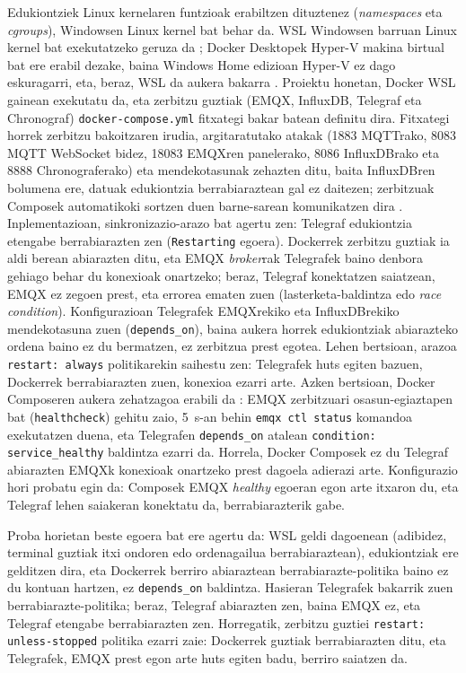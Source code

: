 \documentclass[10pt]{article}
\begin{document}
Edukiontziek Linux kernelaren funtzioak erabiltzen dituztenez (\textit{namespaces} eta \textit{cgroups}), Windowsen Linux kernel bat behar da. \ac{WSL} Windowsen barruan Linux kernel bat exekutatzeko geruza da \cite{microsoft_wsl}; Docker Desktopek Hyper-V makina birtual bat ere erabil dezake, baina Windows Home edizioan Hyper-V ez dago eskuragarri, eta, beraz, \ac{WSL} da aukera bakarra \cite{docker_windows}. Proiektu honetan, Docker \ac{WSL} gainean exekutatu da, eta zerbitzu guztiak (EMQX, InfluxDB, Telegraf eta Chronograf) \texttt{docker-compose.yml} fitxategi bakar batean definitu dira. Fitxategi horrek zerbitzu bakoitzaren irudia, argitaratutako atakak (1883 \ac{MQTT}rako, 8083 \ac{MQTT} WebSocket bidez, 18083 EMQXren panelerako, 8086 InfluxDBrako eta 8888 Chronograferako) eta mendekotasunak zehazten ditu, baita InfluxDBren bolumena ere, datuak edukiontzia berrabiaraztean gal ez daitezen; zerbitzuak Composek automatikoki sortzen duen barne-sarean komunikatzen dira \cite{docker_networking}.\\

Inplementazioan, sinkronizazio-arazo bat agertu zen: Telegraf edukiontzia etengabe berrabiarazten zen (\texttt{Restarting} egoera). Dockerrek zerbitzu guztiak ia aldi berean abiarazten ditu, eta EMQX \textit{broker}rak Telegrafek baino denbora gehiago behar du konexioak onartzeko; beraz, Telegraf konektatzen saiatzean, EMQX ez zegoen prest, eta errorea ematen zuen (lasterketa-baldintza edo \textit{race condition}). Konfigurazioan Telegrafek EMQXrekiko eta InfluxDBrekiko mendekotasuna zuen (\texttt{depends\_on}), baina aukera horrek edukiontziak abiarazteko ordena baino ez du bermatzen, ez zerbitzua prest egotea. Lehen bertsioan, arazoa \texttt{restart: always} politikarekin saihestu zen: Telegrafek huts egiten bazuen, Dockerrek berrabiarazten zuen, konexioa ezarri arte. Azken bertsioan, Docker Composeren aukera zehatzagoa erabili da \cite{docker_startup}: EMQX zerbitzuari osasun-egiaztapen bat (\texttt{healthcheck}) gehitu zaio, 5~s-an behin \texttt{emqx ctl status} komandoa exekutatzen duena, eta Telegrafen \texttt{depends\_on} atalean \texttt{condition: service\_healthy} baldintza ezarri da. Horrela, Docker Composek ez du Telegraf abiarazten EMQXk konexioak onartzeko prest dagoela adierazi arte. Konfigurazio hori probatu egin da: Composek EMQX \textit{healthy} egoeran egon arte itxaron du, eta Telegraf lehen saiakeran konektatu da, berrabiarazterik gabe.\

Proba horietan beste egoera bat ere agertu da: \ac{WSL} geldi dagoenean (adibidez, terminal guztiak itxi ondoren edo ordenagailua berrabiaraztean), edukiontziak ere gelditzen dira, eta Dockerrek berriro abiaraztean berrabiarazte-politika baino ez du kontuan hartzen, ez \texttt{depends\_on} baldintza. Hasieran Telegrafek bakarrik zuen berrabiarazte-politika; beraz, Telegraf abiarazten zen, baina EMQX ez, eta Telegraf etengabe berrabiarazten zen. Horregatik, zerbitzu guztiei \texttt{restart: unless-stopped} politika ezarri zaie: Dockerrek guztiak berrabiarazten ditu, eta Telegrafek, EMQX prest egon arte huts egiten badu, berriro saiatzen da.\\
\end{document}
